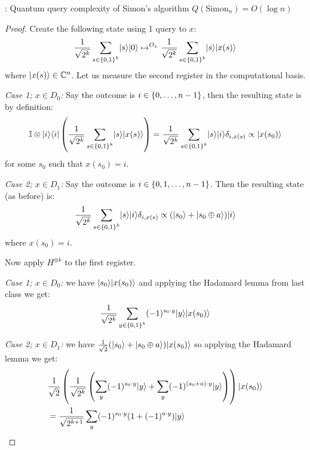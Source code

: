 \begin{propbox}{: Quantum query complexity of Simon's algorithm}
    $Q(\text{Simon}_n) = O(\log n)$
\end{propbox}
\begin{proof}
    Create the following state using 1 query to $x$:
    \begin{equation}
        \frac{1}{\sqrt{2^k}}\sum_{s \in \set{0, 1}^k}\lvert s \rangle\lvert 0 \rangle \mapsto^{O_x} \frac{1}{\sqrt{2^k}}\sum_{s \in \set{0, 1}^k}\lvert s \rangle\lvert x(s) \rangle
    \end{equation}
    where $\lvert x(s) \rangle \in \mathbb{C}^n$. Let us measure the second register in the computational basis.
    
    \emph{Case 1; $x \in D_0$:} Say the outcome is $i \in \set{0, \ldots, n-1}$, then the resulting state is by definition:
    \begin{equation}
        \mathbb{I} \otimes \lvert i \rangle \langle i \rvert\left(\frac{1}{\sqrt{2^k}}\sum_{s \in \set{0, 1}^k}\lvert s \rangle\lvert x(s) \rangle\right) = \frac{1}{\sqrt{2^k}}\sum_{s \in \set{0, 1}^k}\lvert s \rangle\lvert i \rangle\delta_{i, x(s)} \propto \lvert x(s_0) \rangle
    \end{equation}
    for some $s_0$ such that $x(s_0) = i$. 

    \emph{Case 2; $x \in D_1$:} Say the outcome is $i \in \set{0, 1, \ldots, n-1}$. Then the resulting state (as before) is:
    \begin{equation}
        \frac{1}{\sqrt{2^k}}\sum_{s \in \set{0, 1}^k}\lvert s \rangle\lvert i \rangle\delta_{i, x(s)} \propto (\lvert s_0 \rangle + \lvert s_0 \oplus a \rangle)\lvert i \rangle
    \end{equation}
    where $x(s_0) = i$. 
    
    Now apply $H^{\otimes k}$ to the first register.
    
    \emph{Case 1; $x \in D_0$:} we have $\lvert s_0 \rangle\lvert x(s_0) \rangle$ and applying the Hadamard lemma from last class we get:
    \begin{equation}
        \frac{1}{\sqrt{2^k}}\sum_{y \in \set{0, 1}^k}(-1)^{s_0 \cdot y}\lvert y \rangle\lvert x(s_0) \rangle
    \end{equation}

    \emph{Case 2; $x \in D_1$:} we have $\frac{1}{\sqrt{2}}(\lvert s_0 \rangle + \lvert s_0 \oplus a \rangle)\lvert x(s_0) \rangle$ so applying the Hadamard lemma we get:
    \begin{align}
        &\frac{1}{\sqrt{2}}\left(\frac{1}{\sqrt{2^k}}\left(\sum_y (-1)^{s_0 \cdot y}\lvert y \rangle + \sum_y (-1)^{(s_0 + a) \cdot y}\lvert y \rangle\right)\right)\lvert x(s_0) \rangle
        \\ &= \frac{1}{\sqrt{2^{k+1}}}\sum_y (-1)^{s_0 \cdot y}(1 + (-1)^{a \cdot y})\lvert y \rangle
    \end{align}


\end{proof}
